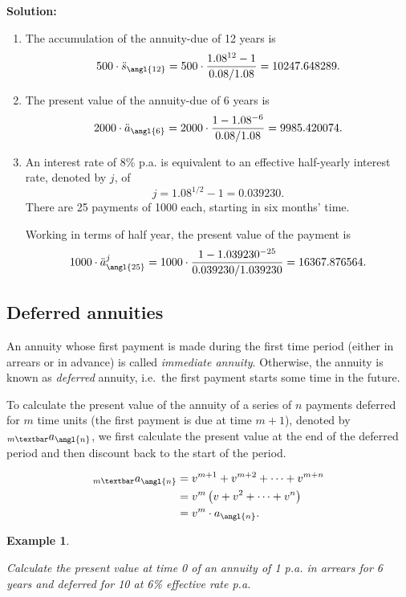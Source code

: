 \documentclass[landscape, 20pt]{extreport}
\theoremstyle{definition}
\theoremstyle{definition}
\newtheorem{example}{Example}[chapter]
\theoremstyle{definition}
\theoremstyle{definition}
\theoremstyle{remark}
\begin{document}
\textbf{Solution:}

\begin{enumerate}
\def\labelenumi{\arabic{enumi}.}
\item
  The accumulation of the annuity-due of 12 years is
  \[500 \cdot \ddot{s}_\angl{12} = 500 \cdot \frac{1.08^{12} -1}{0.08/1.08} = 10247.648289.\]
\item
  The present value of the annuity-due of 6 years is
  \[2000 \cdot \ddot{a}_\angl{6} = 2000 \cdot \frac{1- 1.08^{-6}}{0.08/1.08} = 9985.420074.\]
\item
  An interest rate of 8\% p.a. is equivalent to an effective
  half-yearly interest rate, denoted by \(j\), of
  \[j = 1.08^{1/2} -1 = 0.039230.\] There are 25 payments of 1000
  each, starting in six months' time.

  Working in terms of half year, the present value of the payment is
  \[1000 \cdot \ddot{a}^j_\angl{25} = 1000 \cdot \frac{1 - 1.039230^{-25} }{0.039230/1.039230 } = 16367.876564.\]
\end{enumerate}

\hypertarget{deferred-annuities}{%
\subsection{Deferred annuities}\label{deferred-annuities}}

An annuity whose first payment is made during the first time period
(either in arrears or in advance) is called \emph{immediate annuity}.
Otherwise, the annuity is known as \emph{deferred} annuity, i.e.~the first
payment starts some time in the future.

To calculate the present value of the annuity of a series of \(n\)
payments deferred for \(m\) time units (the first payment is due at time
\(m+1\)), denoted by \(_{m \textbar}a_\angl{n}\), we first calculate the
present value at the end of the deferred period and then discount back
to the start of the period.

\[\begin{aligned}
    _{m \textbar} a_\angl{n}  &= v^{m+1} + v^{m+2} + \cdots +v^{m+n}  \\
    &= v^m  \left( v + v^2 + \cdots + v^n  \right) \\
    &= v^m \cdot  a_\angl{n}.\end{aligned}\]

\newpage \begin{example}
\protect\hypertarget{exm:unlabeled-div-26}{}\label{exm:unlabeled-div-26}

\emph{Calculate the present value at time 0 of an annuity
of 1 p.a. in arrears for 6 years and deferred for 10 at 6\% effective
rate p.a.}

\end{example}
\end{document}

